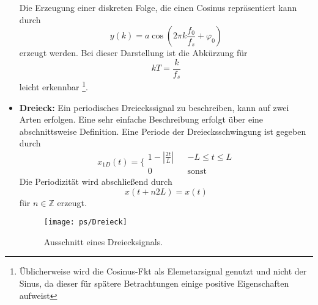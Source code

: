 \begin{itemize}
Die Erzeugung einer diskreten Folge, die einen Cosinus repräsentiert kann durch
\begin{equation}\label{eq:DiscreteSinus}
    y(k) = a \cos\left(2\pi k \frac{f_0}{f_s}  + \varphi_0 \right)
\end{equation}
erzeugt werden. Bei dieser Darstellung ist die Abkürzung für
\[
    kT = \frac{k}{f_s}
\]
leicht erkennbar \footnote{Üblicherweise wird die Cosinus-Fkt als Elemetarsignal genutzt und nicht der Sinus, da dieser für spätere Betrachtungen einige positive Eigenschaften aufweist}.


\item{{\bf Dreieck:} Ein periodisches Dreieckssignal zu beschreiben, kann auf zwei Arten erfolgen.
Eine sehr einfache Beschreibung erfolgt über eine abschnittsweise Definition. Eine Periode der
Dreiecksschwingung ist gegeben durch
\begin{equation}\label{eq:DreieckAbschnitt}
x_{1D}(t) = \bigg\{ \begin{array}{lcc}
1-\left|\frac{2t}{L}\right| & & -L \leq t \leq L\\
0 & & \mbox{sonst}
\end{array}
\end{equation}
Die Periodizität wird abschließend durch
\begin{equation}
x(t+n2L) = x(t)
\end{equation}
für $n \in\mathbb{Z}$ erzeugt.
\begin{figure}[h]
\begin{center}
\texttt{[image: ps/Dreieck]}
\caption{\label{pic:DreieckFunktion} Ausschnitt eines Dreiecksignals.}
\end{center}
\end{figure}

}
\end{itemize}

